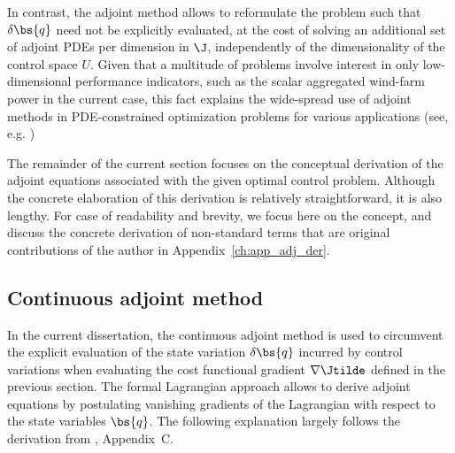 	In contrast, the adjoint method allows to reformulate the problem such that $\delta \bs{q}$ need not be explicitly evaluated, at the cost of solving an additional set of adjoint PDEs per dimension in $\J$, independently of the dimensionality of the control space $U$. Given that a multitude of problems involve interest in  only low-dimensional performance indicators, such as  the scalar aggregated wind-farm power in the current case, this fact explains the wide-spread use of adjoint methods in PDE-constrained optimization problems for various applications (see, e.g. \cite{choi1999instantaneous, aage2008topology, dekeyser2014divertor})
	
	The remainder of the current section focuses on the conceptual derivation of the adjoint equations associated with the given optimal control problem. Although the concrete elaboration of this derivation is relatively straightforward, it is also lengthy. For case of readability and brevity, we focus here on the concept, and discuss the concrete derivation of non-standard terms that are original contributions of the author in Appendix~\ref{ch:app_adj_der}.

	\subsection{Continuous adjoint method}
	In the current dissertation, the continuous adjoint method is used to circumvent the explicit evaluation of the state variation $\delta \bs{q}$ incurred by control variations when evaluating the cost functional gradient $\nabla \Jtilde$ defined in the previous section. The formal Lagrangian approach \citep{troltzsch, borzinschulz} allows to derive adjoint equations by postulating vanishing gradients of the Lagrangian with respect to the state variables $\bs{q}$. The following explanation largely follows the derivation from \cite{goit2015optimal}, Appendix~C.
	
